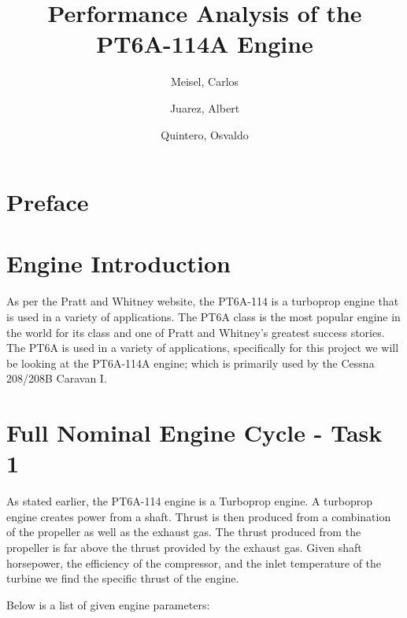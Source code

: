 \documentclass[titlepage]{article}
\author{
    Meisel, Carlos \\
  \and
  Juarez, Albert\\
  \and
    Quintero, Osvaldo\\
}
\title{Performance Analysis of the PT6A-114A Engine}
\begin{document}
  \maketitle

  \tableofcontents

    \section{Preface}

    \section{Engine Introduction}

    As per the Pratt and Whitney website, the PT6A-114 is a turboprop engine that is used in a variety of applications. 
    The PT6A class is the most popular engine in the world for its class and one of Pratt and Whitney's greatest success stories.
    The PT6A is used in a variety of applications, specifically for this project we will be looking at the PT6A-114A engine; which is 
    primarily used by the Cessna 208/208B Caravan I. 

    \section{Full Nominal Engine Cycle - Task 1}

    As stated earlier, the PT6A-114 engine is a Turboprop engine.
    A turboprop engine creates power from a shaft. Thrust is then produced from a combination of the propeller as well as the exhaust gas. The thrust produced from the propeller is far above the thrust provided by the exhaust gas. Given shaft horsepower, the efficiency of the compressor, and the inlet temperature of the turbine we find the specific thrust of the engine.

    Below is a list of given engine parameters:
\end{document}
